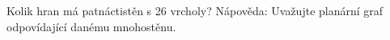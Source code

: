 \subsubsection{}
Kolik hran má patnáctistěn s 26 vrcholy? Nápověda: Uvažujte planární graf
odpovídající danému mnohostěnu.
